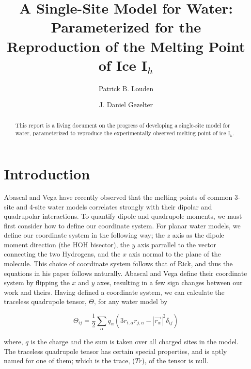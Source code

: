 \documentclass[aps, jcp, prl, reprint, groupedaddress, superscriptaddress, twocolumn]{revtex4-1}
\begin{document}
\title{A Single-Site Model for Water: Parameterized for the Reproduction of the Melting Point of Ice I$_h$}
\author{Patrick B. Louden}
\author{J. Daniel Gezelter}

\newcommand{\degree}{\ensuremath{^\circ}}

\begin{abstract}
This report is a living document on the progress of developing a single-site
model for water, parameterized to reproduce the experimentally observed
melting point of ice I$_h$.
\end{abstract}

\maketitle


\section{Introduction}
Abascal and Vega have recently observed that the melting points of common 
3-site and 4-site water models correlates strongly with their dipolar and 
quadrupolar interactions.\cite{Abascal07b,Abascal07c,Abascal07d} To quantify
dipole and quadrupole moments, we must first consider how to define our
coordinate system. For planar
water models, we define our coordinate system in the following way;
the $z$ axis as the dipole moment direction (the HOH bisector), the $y$ axis
parrallel to the vector connecting the two Hydrogens, and the $x$ axis normal 
to the plane of the molecule. This choice of coordinate system follows that of
Rick, and thus the equations in his paper follows naturally. 
Abascal and Vega define their coordinate system by flipping the $x$ and $y$
axes, resulting in a few sign changes between our work and theirs. Having 
defined a coordinate system, we can calculate the traceless quadrupole tensor,
$\Theta$, for any water model by

\begin{equation}
\Theta_{ij} = \frac{1}{2} \sum_{\alpha}q_{\alpha}(3r_{i,\alpha}r_{j,\alpha}-|\vec{r_{\alpha}}|^{2}\delta_{ij})
\end{equation}

where, $q$ is the charge and the sum is taken over all charged sites in the 
model. The traceless quadrupole tensor has certain special properties, and
is aptly named for one of them; which is the trace, ($Tr$), of the tensor 
is null.
\end{document}
